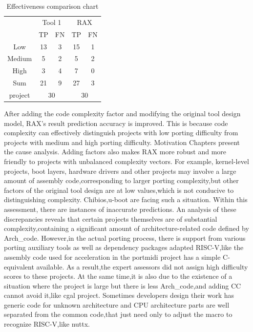 \documentclass[sigconf,screen,review]{acmart}
\begin{document}
\begin{table}
  \caption{Effectiveness comparison chart}
  \label{tab:effectiveness}
  \begin{tabular}{ccccc}
    \toprule
     & \multicolumn{2}{c}{Tool 1} & \multicolumn{2}{c}{RAX} \\
     & TP & FN & TP & FN \\
    \midrule
    Low & 13 & 3 & 15 & 1 \\
    Medium & 5 & 2 & 5 & 2 \\
    High & 3 & 4 & 7 & 0 \\
    Sum & 21 & 9 & 27 & 3 \\
    project & \multicolumn{2}{c}{30} & \multicolumn{2}{c}{30} \\
  \bottomrule
\end{tabular}
\end{table}

After adding the code complexity factor and modifying the original tool design model, RAX's result prediction accuracy is improved.
This is because code complexity can effectively distinguish projects with low porting difficulty from projects with medium and high porting difficulty.
Motivation Chapters present the cause analysis.
Adding factors also makes RAX more robust and more friendly to projects with unbalanced complexity vectors.
For example, kernel-level projects, boot layers, hardware drivers and other projects may involve a large amount of assembly code,corresponding to larger porting complexity,but other factors of the original tool design are at low values,which is not conducive to distinguishing complexity.
Chibios,u-boot are facing such a situation.
Within this assessment, there are instances of inaccurate predictions.
An analysis of these discrepancies reveals that certain projects themselves are of substantial complexity,containing a significant amount of architecture-related code defined by Arch\_code.
However,in the actual porting process, there is support from various porting auxiliary tools as well as dependency packages adapted RISC-V,like the assembly code used for acceleration in the portmidi project has a simple C- equivalent available.
As a result,the expert assessors did not assign high difficulty scores to these projects.
At the same time,it is also due to the existence of a situation where the project is large but there is less Arch\_code,and adding CC cannot avoid it,like cgal project.
Sometimes developers design their work has generic code for unknown architecture and CPU architecture parts are well separated from the common code,that just need only to adjust the macro to recognize RISC-V,like nuttx.
\end{document}
